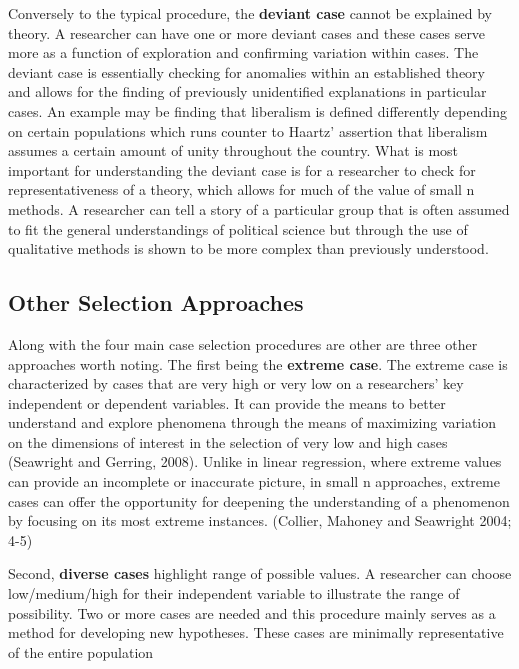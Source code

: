\documentclass{book}
\begin{document}
Conversely to the typical procedure, the \textbf{deviant case} cannot be
explained by theory. A researcher can have one or more deviant cases and these
cases serve more as a function of exploration and confirming variation within
cases. The deviant case is essentially checking for anomalies within an
established theory and allows for the finding of previously unidentified
explanations in particular cases. An example may be finding that liberalism is
defined differently depending on certain populations which runs counter to
Haartz' assertion that liberalism assumes a certain amount of unity throughout
the country. What is most important for understanding the deviant case is for
a researcher to check for representativeness of a theory, which allows for
much of the value of small n methods. A researcher can tell a story of a
particular group that is often assumed to fit the general understandings of
political science but through the use of qualitative methods is shown to be
more complex than previously understood.

\hypertarget{other-selection-approaches}{%
\subsection{Other Selection Approaches}\label{other-selection-approaches}}

Along with the four main case selection procedures are other are three other
approaches worth noting. The first being the \textbf{extreme case}. The
extreme case is characterized by cases that are very high or very low on a
researchers' key independent or dependent variables. It can provide the means
to better understand and explore phenomena through the means of maximizing
variation on the dimensions of interest in the selection of very low and high
cases (Seawright and Gerring, 2008). Unlike in linear regression, where
extreme values can provide an incomplete or inaccurate picture, in small n
approaches, extreme cases can offer the opportunity for deepening the
understanding of a phenomenon by focusing on its most extreme instances.
(Collier, Mahoney and Seawright 2004; 4-5)

Second, \textbf{diverse cases} highlight range of possible values. A
researcher can choose low/medium/high for their independent variable to
illustrate the range of possibility. Two or more cases are needed and this
procedure mainly serves as a method for developing new hypotheses. These cases
are minimally representative of the entire population
\end{document}
